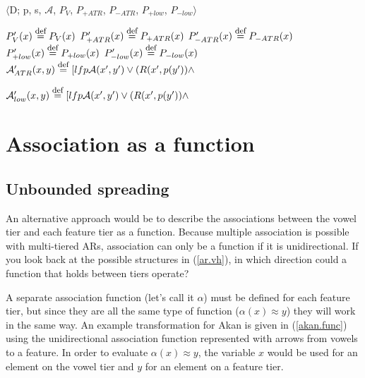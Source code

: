 \documentclass[,doc,floatsintext]{apa6}
\def\defeq{\mathrel{\buildrel \mbox{\footnotesize def} \over =}}
\theoremstyle{definition}
\theoremstyle{definition}
\theoremstyle{definition}
\theoremstyle{remark}
\begin{document}
\begin{exe}
\ex\label{qflfp.spread} $\langle$D; p, s, $\mathcal{A}$, $P_V$, $P_{+ATR}$, $P_{-ATR}$, $P_{+low}$, $P_{-low}\rangle$ 
\end{exe}

\noindent \(P'_{V}(x) \defeq P_{V}(x)\)\newline
\(P'_{+ATR}(x) \defeq P_{+ATR}(x)\) \hspace{0.5in}
\(P'_{-ATR}(x) \defeq P_{-ATR}(x)\)\newline
\(P'_{+low}(x) \defeq P_{+low}(x)\) \hspace{0.5in}
\(P'_{-low}(x) \defeq P_{-low}(x)\)\newline
\(\mathcal{A}_{ATR}'(x, y) \defeq [lfp\mathcal{A}(x', y')\vee (R(x', p(y')) \wedge\)
\vspace{1in}

\noindent \(\mathcal{A}_{low}'(x, y) \defeq [lfp\mathcal{A}(x', y')\vee (R(x', p(y')) \wedge\)

\newpage

\section{Association as a function}\label{association-as-a-function}

\subsection{Unbounded spreading}\label{unbounded-spreading-1}

An alternative approach would be to describe the associations between
the vowel tier and each feature tier as a function. Because multiple
association is possible with multi-tiered ARs, association can only be a
function if it is unidirectional. If you look back at the possible
structures in (\ref{ar.vh}), in which direction could a function that
holds between tiers operate?

A separate association function (let's call it \(\alpha\)) must be
defined for each feature tier, but since they are all the same type of
function (\(\alpha(x)\approx y\)) they will work in the same way. An
example transformation for Akan is given in (\ref{akan.func}) using the
unidirectional association function represented with arrows from vowels
to a feature. In order to evaluate \(\alpha(x)\approx y\), the variable
\(x\) would be used for an element on the vowel tier and \(y\) for an
element on a feature tier.
\end{document}
